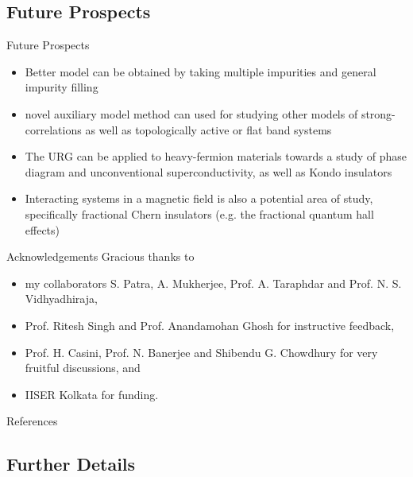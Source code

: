 \documentclass[10pt,aspectratio=169]{beamer}
\begin{document}
\begin{frame}{}
\section{Future Prospects}
\end{frame}

\begin{frame}{Future Prospects}
\begin{itemize}
	\item Better model can be obtained by taking multiple impurities and general impurity filling\\[20pt]
\item novel auxiliary model method can used for studying other models of strong-correlations as well as topologically active or flat band systems\\[20pt]
\item The URG can be applied to heavy-fermion materials towards a study of phase diagram and unconventional superconductivity, as well as Kondo insulators\\[20pt]
\item Interacting systems in a magnetic field is also a potential area of study, specifically fractional Chern insulators (e.g. the fractional quantum hall effects)
\end{itemize}
\end{frame}

\begin{frame}{Acknowledgements}
\flushleft
Gracious thanks to\\[10pt]
\begin{itemize}
	\item my collaborators S. Patra, A. Mukherjee, Prof. A. Taraphdar and Prof. N. S. Vidhyadhiraja,
	\item Prof. Ritesh Singh and Prof. Anandamohan Ghosh for instructive feedback,
	\item Prof. H. Casini, Prof. N. Banerjee and Shibendu G. Chowdhury for very fruitful discussions, and
	\item IISER Kolkata for funding.
\end{itemize}

\end{frame}

\begin{frame}[allowframebreaks]{References}
\printbibliography
\end{frame}

\begin{frame}{}
\section{Further Details}
\end{frame}
\end{document}
